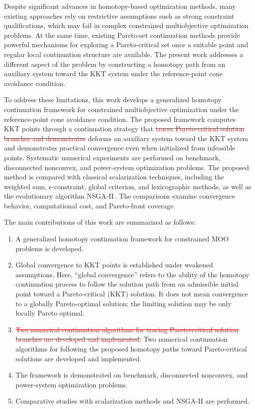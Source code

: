\documentclass[11pt,pdflatex,sn-mathphys-ay]{sn-jnl}%
\theoremstyle{definition}
\theoremstyle{thmstyleone}%
\theoremstyle{thmstyletwo}%
\theoremstyle{thmstylethree}%
\newcommand{\del}[1]{\textcolor{red}{\sout{#1}}}
\newcommand{\add}[1]{\textcolor{revisionblue}{#1}}
\begin{document}
	Despite significant advances in homotopy-based optimization methods,
	many existing approaches rely on restrictive assumptions such as strong
	constraint qualifications, which may fail in complex constrained
	multiobjective optimization problems.
	\add{At the same time, existing Pareto-set continuation methods provide
		powerful mechanisms for exploring a Pareto-critical set once a suitable
		point and regular local continuation structure are available. The
		present work addresses a different aspect of the problem by constructing
		a homotopy path from an auxiliary system toward the KKT system under the
		reference-point cone avoidance condition.}
	
	To address these limitations, this work develops a generalized homotopy
	continuation framework for constrained multiobjective optimization under
	\add{the} reference-point cone avoidance condition. The proposed
	framework computes KKT points through a continuation strategy that
	\del{traces Pareto-critical solution branches and demonstrates}
	\add{deforms an auxiliary system toward the KKT system and demonstrates}
	practical convergence even when initialized from infeasible points.
	Systematic numerical experiments are performed on benchmark, disconnected
	nonconvex, and power-system optimization problems. The proposed method
	is compared with classical scalarization techniques, including the
	weighted sum, $\epsilon$-constraint, global criterion, and lexicographic
	methods, as well as the evolutionary algorithm NSGA-II\,\cite{deb2002fast}. The comparisons
	examine convergence behavior, computational cost, and Pareto-front
	coverage.
	
	The main contributions of this work are summarized as follows:
	\vspace{-0.3cm}
	\begin{enumerate}
		\item A generalized homotopy continuation framework for constrained MOO
		problems is developed.
		
		\item Global convergence to KKT points is established under weakened
		assumptions. \add{Here, ``global convergence'' refers to the ability of
			the homotopy continuation process to follow the solution path from an
			admissible initial point toward a Pareto-critical (KKT) solution. It does
			not mean convergence to a globally Pareto-optimal solution; the limiting
			solution may be only locally Pareto optimal.}
		
		\item
		\del{Two numerical continuation algorithms for tracing Pareto-critical
			solution branches are developed and implemented.}
		\add{Two numerical continuation algorithms for following the proposed
			homotopy paths toward Pareto-critical solutions are developed and
			implemented.}
		
		\item The framework is demonstrated on benchmark, disconnected nonconvex,
		and power-system optimization problems.
		
		\item Comparative studies with scalarization methods and NSGA-II are
		performed.
	\end{enumerate}
	
\end{document}
